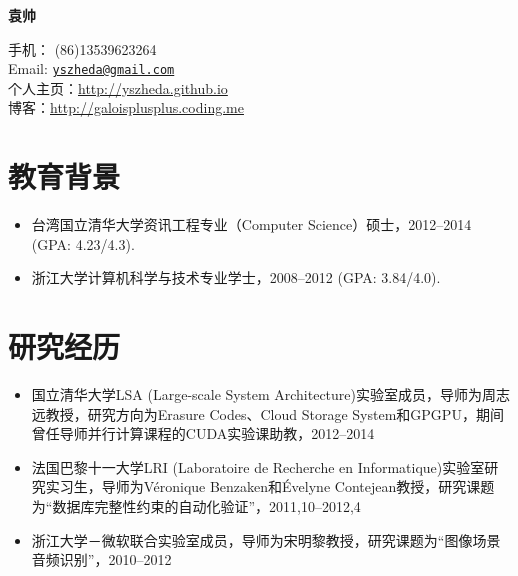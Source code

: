 \documentclass[letterpaper]{article}
\def\name{袁帅}
\begin{document}
\centerline{\huge\bf \name} \vspace{0.25in}
\begin{minipage}[t]{0.8\textwidth}
  手机： (86)13539623264   \\
  Email: \href{mailto:yszheda@gmail.com}{\tt yszheda@gmail.com} \\
  个人主页：\url{http://yszheda.github.io} \\
  博客：\url{http://galoisplusplus.coding.me}
\end{minipage}

\section*{教育背景}
\begin{itemize}
  \item 台湾国立清华大学资讯工程专业（Computer Science）硕士，2012--2014 (GPA: 4.23/4.3).
  \item 浙江大学计算机科学与技术专业学士，2008--2012 (GPA: 3.84/4.0).
\end{itemize}

\section*{研究经历}
\begin{itemize}
  \item 国立清华大学LSA (Large-scale System Architecture)实验室成员，导师为周志远教授，研究方向为Erasure Codes、Cloud Storage System和GPGPU，期间曾任导师并行计算课程的CUDA实验课助教，2012--2014
  \item 法国巴黎十一大学LRI (Laboratoire de Recherche en Informatique)实验室研究实习生，导师为V\'eronique Benzaken和\'Evelyne Contejean教授，研究课题为“数据库完整性约束的自动化验证”，2011,10--2012,4
  \item 浙江大学－微软联合实验室成员，导师为宋明黎教授，研究课题为“图像场景音频识别”，2010--2012
\end{itemize}
\end{document}
